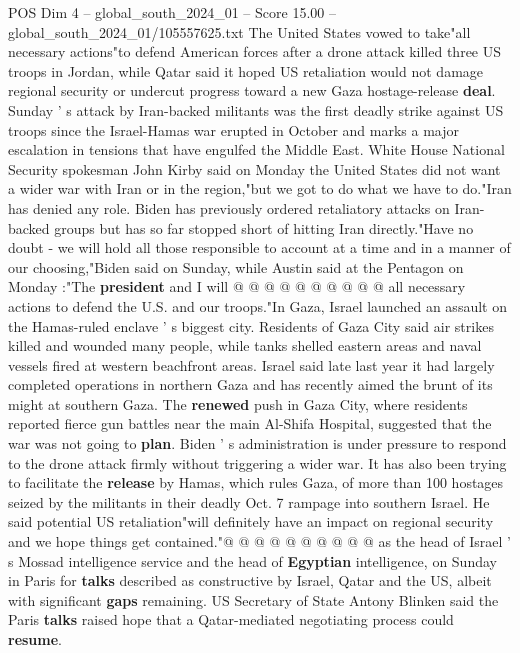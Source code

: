 \begin{textsample}{POS Dim 4 – global\_south\_2024\_01 – Score 15.00 – global\_south\_2024\_01/105557625.txt}  \label{ex:f4_pos_375}
The United States vowed to take"all necessary actions"to defend American forces after a drone attack killed three US troops in Jordan, while Qatar said it hoped US retaliation would not damage regional security or undercut progress toward a new Gaza hostage-release \textbf{deal}.
Sunday ' s attack by Iran-backed militants was the first deadly strike against US troops since the Israel-Hamas war erupted in October and marks a major escalation in tensions that have engulfed the Middle East.
White House National Security spokesman John Kirby said on Monday the United States did not want a wider war with Iran or in the region,"but we got to do what we have to do."Iran has denied any role.
Biden has previously ordered retaliatory attacks on Iran-backed groups but has so far stopped short of hitting Iran directly."Have no doubt - we will hold all those responsible to account at a time and in a manner of our choosing,"Biden said on Sunday, while Austin said at the Pentagon on Monday :"The \textbf{president} and I will @ @ @ @ @ @ @ @ @ @ all necessary actions to defend the U.S. and our troops."In Gaza, Israel launched an assault on the Hamas-ruled enclave ' s biggest city.
Residents of Gaza City said air strikes killed and wounded many people, while tanks shelled eastern areas and naval vessels fired at western beachfront areas.
Israel said late last year it had largely completed operations in northern Gaza and has recently aimed the brunt of its might at southern Gaza.
The \textbf{renewed} push in Gaza City, where residents reported fierce gun battles near the main Al-Shifa Hospital, suggested that the war was not going to \textbf{plan}.
Biden ' s administration is under pressure to respond to the drone attack firmly without triggering a wider war.
It has also been trying to facilitate the \textbf{release} by Hamas, which rules Gaza, of more than 100 hostages seized by the militants in their deadly Oct. 7 rampage into southern Israel.
He said potential US retaliation"will definitely have an impact on regional security and we hope things get contained."@ @ @ @ @ @ @ @ @ @ as the head of Israel ' s Mossad intelligence service and the head of \textbf{Egyptian} intelligence, on Sunday in Paris for \textbf{talks} described as constructive by Israel, Qatar and the US, albeit with significant \textbf{gaps} remaining.
US Secretary of State Antony Blinken said the Paris \textbf{talks} raised hope that a Qatar-mediated negotiating process could \textbf{resume}.

\end{textsample}
